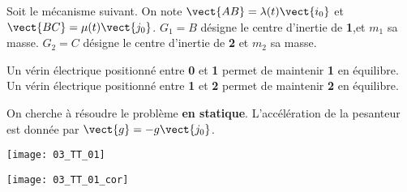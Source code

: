 \normaltrue
\correctiontrue



\setcounter{question}{0}%
\ifcorrection
\else
{}
\fi

\ifprof
\else
Soit le mécanisme suivant. On note $\vect{AB}=\lambda(t)\vect{i_0}$ et $\vect{BC}=\mu(t)\vect{j_0}$.
$G_1 = B$ désigne le centre d'inertie de \textbf{1},et $m_1$ sa masse. %
$G_2 = C$ désigne le centre d'inertie de \textbf{2} et  $m_2$ sa masse. %

 Un vérin électrique positionné entre \textbf{0} et \textbf{1} permet de maintenir \textbf{1} en équilibre.
 Un vérin électrique positionné entre \textbf{1} et \textbf{2} permet de maintenir \textbf{2} en équilibre.
 
 On cherche à résoudre le problème \textbf{en statique}.
L'accélération de la pesanteur est donnée par $\vect{g}=-g\vect{j_0}$.



\begin{marginfigure}
\texttt{[image: 03\_TT\_01]}
\end{marginfigure}
\fi

\ifprof
\begin{marginfigure}
\texttt{[image: 03\_TT\_01\_cor]}
\end{marginfigure}

\else
\fi

